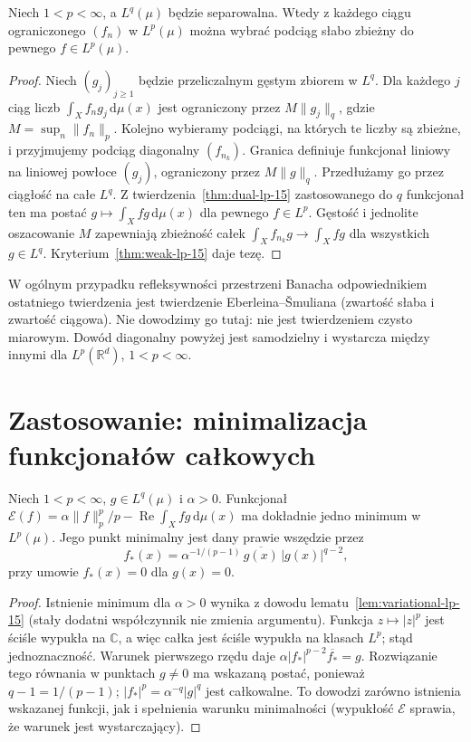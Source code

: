 \begin{twierdzenie}
\label{thm:weak-subseq-15}
Niech $1<p<\infty$, a $L^q(\mu)$ będzie separowalna.
Wtedy z każdego ciągu ograniczonego $(f_n)$ w $L^p(\mu)$
można wybrać podciąg słabo zbieżny do pewnego $f\in L^p(\mu)$.
\end{twierdzenie}
\begin{proof}
Niech $(g_j)_{j\ge1}$ będzie przeliczalnym gęstym
zbiorem w $L^q$. Dla każdego $j$ ciąg liczb
$\int_Xf_n g_j\,\mathrm d\mu(x)$ jest ograniczony przez
$M\|g_j\|_q$, gdzie $M=\sup_n\|f_n\|_p$.
Kolejno wybieramy podciągi, na których te liczby
są zbieżne, i przyjmujemy podciąg diagonalny
$(f_{n_k})$. Granica definiuje funkcjonał liniowy na
liniowej powłoce $(g_j)$, ograniczony przez $M\|g\|_q$.
Przedłużamy go przez ciągłość na całe $L^q$.
Z twierdzenia~\ref{thm:dual-lp-15} zastosowanego do $q$
funkcjonał ten ma postać $g\mapsto\int_Xfg\,\mathrm d\mu(x)$
dla pewnego $f\in L^p$. Gęstość i jednolite
oszacowanie $M$ zapewniają zbieżność całek
$\int_Xf_{n_k}g\to\int_Xfg$ dla wszystkich $g\in L^q$.
Kryterium~\ref{thm:weak-lp-15} daje tezę.
\end{proof}

\begin{uwaga}
W ogólnym przypadku refleksywności przestrzeni Banacha
odpowiednikiem ostatniego twierdzenia jest twierdzenie
Eberleina--\v Smuliana (zwartość słaba i zwartość ciągowa).
Nie dowodzimy go tutaj: nie jest twierdzeniem czysto
miarowym. Dowód diagonalny powyżej jest samodzielny
i wystarcza między innymi dla $L^p(\mathbb R^d)$,
$1<p<\infty$.
\end{uwaga}

\section{Zastosowanie: minimalizacja funkcjonałów całkowych}
\begin{twierdzenie}
\label{thm:minimize-lp-15}
Niech $1<p<\infty$, $g\in L^q(\mu)$ i $\alpha>0$.
Funkcjonał $\mathcal E(f)=\alpha\|f\|_p^p/p
-\operatorname{Re}\int_X f g\,\mathrm d\mu(x)$
ma dokładnie jedno minimum w $L^p(\mu)$. Jego
punkt minimalny jest dany prawie wszędzie przez
\[
f_*(x)=\alpha^{-1/(p-1)}\,\overline{g(x)}\,|g(x)|^{q-2},
\]
przy umowie $f_*(x)=0$ dla $g(x)=0$.
\end{twierdzenie}
\begin{proof}
Istnienie minimum dla $\alpha>0$ wynika z dowodu
lematu~\ref{lem:variational-lp-15} (stały dodatni
współczynnik nie zmienia argumentu). Funkcja
$z\mapsto|z|^p$ jest ściśle wypukła na $\mathbb C$,
a więc całka jest ściśle wypukła na klasach $L^p$;
stąd jednoznaczność. Warunek pierwszego rzędu daje
$\alpha|f_*|^{p-2}\overline{f_*}=g$.
Rozwiązanie tego równania w punktach $g\ne0$
ma wskazaną postać, ponieważ $q-1=1/(p-1)$;
$|f_*|^p=\alpha^{-q}|g|^q$ jest całkowalne.
To dowodzi zarówno istnienia wskazanej funkcji,
jak i spełnienia warunku minimalności (wypukłość
$\mathcal E$ sprawia, że warunek jest wystarczający).
\end{proof}

